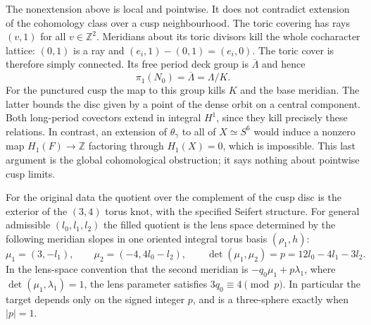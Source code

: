 The nonextension above is local and pointwise.  It does not
contradict extension of the cohomology class over a cusp
neighbourhood.  The toric covering has rays $(v,1)$ for all
$v\in\mathbb Z^2$.  Meridians about its toric divisors kill
the whole cocharacter lattice: $(0,1)$ is a ray and
$(e_i,1)-(0,1)=(e_i,0)$.  The toric cover is therefore simply
connected.  Its free period deck group is $\overline\Lambda$
and hence
\[
 \pi_1(N_0)=\overline\Lambda=\Lambda/K.
 \label{mapsI:quotient-eq-5}
\]
For the punctured cusp the map to this group kills $K$ and
the base meridian.  The latter bounds the disc given by a
point of the dense orbit on a central component.  Both
long-period covectors extend in integral $H^1$, since they
kill precisely these relations.  In contrast, an extension
of $\theta_\gamma$ to all of $X\simeq S^6$ would induce a
nonzero map $H_1(F)\to\mathbb Z$ factoring through
$H_1(X)=0$, which is impossible.  This last argument is the
global cohomological obstruction; it says nothing about
pointwise cusp limits.

\begin{proposition}\label{mapsI:src:A.1.3}

For the original data the quotient over the complement of
the cusp disc is the exterior of the $(3,4)$ torus knot,
with the specified Seifert structure.  For general admissible
$(l_0,l_1,l_2)$ the filled quotient is the lens space determined
by the following meridian slopes in one oriented integral
torus basis $(\rho_1,h)$:
\[
 \mu_1=(3,-l_1),\qquad
 \mu_2=(-4,4l_0-l_2),\qquad
 \det(\mu_1,\mu_2)=p=12l_0-4l_1-3l_2.
 \label{mapsI:quotient-eq-6}
\]
In the lens-space convention that the second meridian is
$-q_0\mu_1+p\lambda_1$, where
$\det(\mu_1,\lambda_1)=1$, the lens parameter satisfies
$3q_0\equiv4\pmod p$.  In particular the target depends only
on the signed integer $p$, and is a three-sphere exactly
when $|p|=1$.
\end{proposition}



